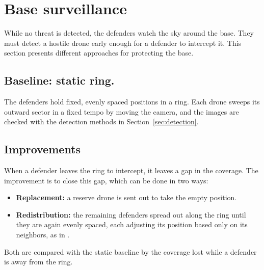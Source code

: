 \section{Base surveillance}\label{sec:base_surveillance}
While no threat is detected, the defenders watch the sky around the base. They must detect a hostile drone early enough for a defender to intercept it. This section presents different approaches for protecting the base.

\subsection{Baseline: static ring.} The defenders hold fixed, evenly spaced
positions in a ring. Each drone sweeps its outward sector in a fixed tempo by moving the camera, and the images are checked with the detection methods in Section~\ref{sec:detection}.

\subsection{Improvements}
When a defender leaves the ring to intercept, it leaves a gap in the
coverage. The improvement is to close this gap, which can be done in two
ways:
\begin{itemize}
    \item \textbf{Replacement:} a reserve drone is         sent out to take the
          empty position.
    \item \textbf{Redistribution:} the remaining           defenders spread out along
          the ring until they are again evenly spaced, each adjusting its
          position based only on its neighbors, as in
          \cite{kingston2008perimeter}.
\end{itemize}
Both are compared with the static baseline by the coverage lost while a
defender is away from the ring.



